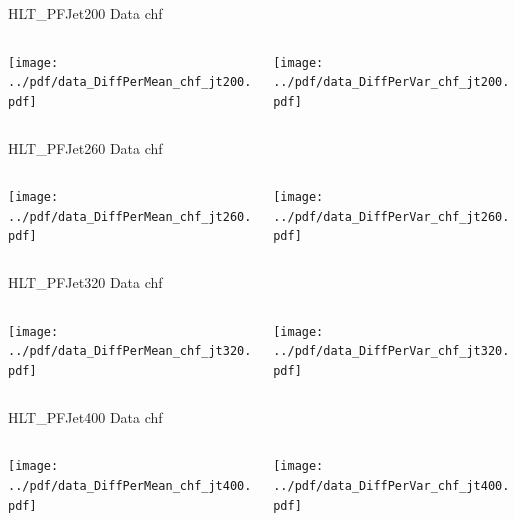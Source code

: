 \documentclass[9pt]{beamer}
\begin{document}
\begin{frame}[t]{HLT\_PFJet200 Data chf}
\begin{columns}[T]
  \begin{column}{.5\textwidth}
  \texttt{[image: ../pdf/data\_DiffPerMean\_chf\_jt200.pdf]}
  \end{column}
  \begin{column}{.5\textwidth}
  \texttt{[image: ../pdf/data\_DiffPerVar\_chf\_jt200.pdf]}
  \end{column}
\end{columns}
\end{frame}

\begin{frame}[t]{HLT\_PFJet260 Data chf}
\begin{columns}[T]
  \begin{column}{.5\textwidth}
  \texttt{[image: ../pdf/data\_DiffPerMean\_chf\_jt260.pdf]}
  \end{column}
  \begin{column}{.5\textwidth}
  \texttt{[image: ../pdf/data\_DiffPerVar\_chf\_jt260.pdf]}
  \end{column}
\end{columns}
\end{frame}

\begin{frame}[t]{HLT\_PFJet320 Data chf}
\begin{columns}[T]
  \begin{column}{.5\textwidth}
  \texttt{[image: ../pdf/data\_DiffPerMean\_chf\_jt320.pdf]}
  \end{column}
  \begin{column}{.5\textwidth}
  \texttt{[image: ../pdf/data\_DiffPerVar\_chf\_jt320.pdf]}
  \end{column}
\end{columns}
\end{frame}

\begin{frame}[t]{HLT\_PFJet400 Data chf}
\begin{columns}[T]
  \begin{column}{.5\textwidth}
  \texttt{[image: ../pdf/data\_DiffPerMean\_chf\_jt400.pdf]}
  \end{column}
  \begin{column}{.5\textwidth}
  \texttt{[image: ../pdf/data\_DiffPerVar\_chf\_jt400.pdf]}
  \end{column}
\end{columns}
\end{frame}
\end{document}
